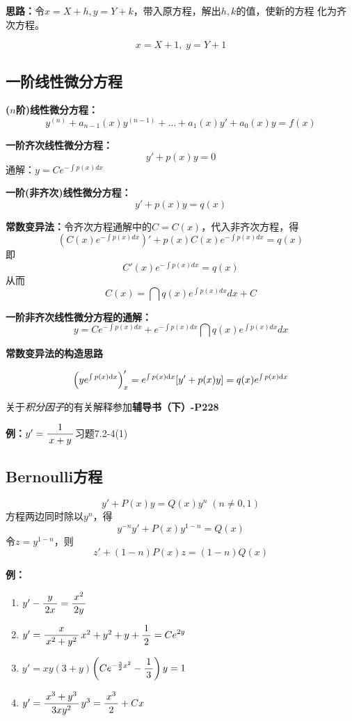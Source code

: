 {\bf 思路：}令$x=X+h,y=Y+k$，带入原方程，解出$h,k$的值，使新的方程
化为齐次方程。

$$x=X+1,\;y=Y+1$$

\subsection{一阶线性微分方程}

{\bf ($n$阶)线性微分方程：}
$$y^{(n)}+a_{n-1}(x)y^{(n-1)}+\ldots+a_1(x)y'+a_0(x)y=f(x)$$

{\bf 一阶齐次线性微分方程：}
$$y'+p(x)y=0$$
通解：$y=Ce^{-\int p(x)dx}$

{\bf 一阶(非齐次)线性微分方程：}
$$y'+p(x)y=q(x)$$

{\bf 常数变异法：}令齐次方程通解中的$C=C(x)$，代入非齐次方程，得
$$\left(C(x)e^{-\int p(x)dx}\right)'+p(x)C(x)e^{-\int
 p(x)dx}=q(x)$$
即
$$C'(x)e^{-\int p(x)dx}=q(x)$$
从而
$$C(x)=\dint q(x)e^{\int p(x)dx}dx+C$$ 

{\bf 一阶非齐次线性微分方程的通解：}
$$y=Ce^{-\int p(x)dx}+e^{-\int p(x)dx}\dint q(x)e^{\int p(x)dx}dx$$

\begin{shaded}
{\bf 常数变异法的构造思路}

$$\left(ye^{\int p(x)\mathrm{d} x}\right)'_x=e^{\int p(x)\mathrm{d} x}[y'+p(x)y]
=q(x)e^{\int p(x)\mathrm{d} x}$$

关于{\it 积分因子}的有关解释参加{\bf 辅导书（下）-P228}
\end{shaded}

{\bf 例：}$y'=\displaystyle\frac{\,{1}\,}{\,{x+y}\,}$\hfill 习题7.2-4(1)

\subsection{Bernoulli方程}

$$y'+P(x)y=Q(x)y^n\;(n\ne 0,1)$$ 
方程两边同时除以$y^n$，得
$$y^{-n}y'+P(x)y^{1-n}=Q(x)$$ 
令$z=y^{1-n}$，则
$$z'+(1-n)P(x)z=(1-n)Q(x)$$

{\bf 例：}
\begin{enumerate}[(1)]
  \setlength{\itemindent}{1cm}
  \item $y'-\displaystyle\frac{\,{y}\,}{\,{2x}\,}=\displaystyle\frac{\,{x^2}\,}{\,{2y}\,}$
  \item $y'=\displaystyle\frac{\,{x}\,}{\,{x^2+y^2}\,}$\hfill$x^2+y^2+y+\displaystyle\frac{\,{1}\,}{\,{2}\,}=Ce^{2y}$
  \item $y'=xy(3+y)$\hfill$\left(Ce^{-\frac32x^2}-\displaystyle\frac{\,{1}\,}{\,{3}\,}\right)y=1$
  \item $y'=\displaystyle\frac{\,{x^3+y^3}\,}{\,{3xy^2}\,}$\hfill$y^3=\displaystyle\frac{\,{x^3}\,}{\,{2}\,}+Cx$
\end{enumerate}

